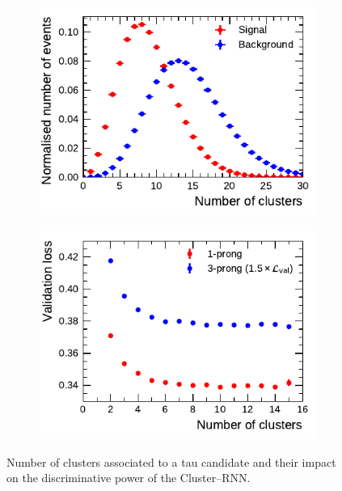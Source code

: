 \begin{figure}[ht]
  \begin{subfigure}[t]{0.48\textwidth}
    \centering
    \includegraphics{./figures/rnn/ncls_1p.pdf}
  \end{subfigure}%
  \begin{subfigure}[t]{0.48\textwidth}
    \centering
    \includegraphics{./figures/rnn/nscan/cluster_1p_3p.pdf}
  \end{subfigure}
  \caption{Number of clusters associated to a tau candidate and their impact on
    the discriminative power of the Cluster--RNN.}
  \label{fig:rnn_nclusters}
\end{figure}

